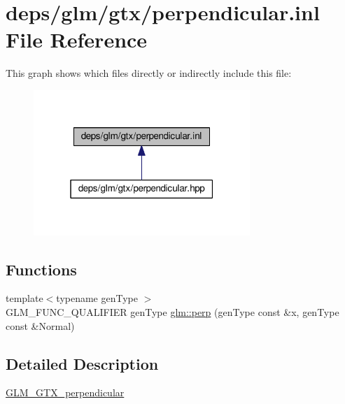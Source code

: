 \hypertarget{perpendicular_8inl}{}\section{deps/glm/gtx/perpendicular.inl File Reference}
\label{perpendicular_8inl}
This graph shows which files directly or indirectly include this file\+:
\nopagebreak
\begin{figure}[H]
\begin{center}
\leavevmode
\includegraphics[width=232pt]{dc/d5a/perpendicular_8inl__dep__incl}
\end{center}
\end{figure}
\subsection*{Functions}
\begin{DoxyCompactItemize}
\item 
{\footnotesize template$<$typename gen\+Type $>$ }\\G\+L\+M\+\_\+\+F\+U\+N\+C\+\_\+\+Q\+U\+A\+L\+I\+F\+I\+ER gen\+Type \hyperlink{group__gtx__perpendicular_ga264cfc4e180cf9b852e943b35089003c}{glm\+::perp} (gen\+Type const \&x, gen\+Type const \&Normal)
\end{DoxyCompactItemize}


\subsection{Detailed Description}
\hyperlink{group__gtx__perpendicular}{G\+L\+M\+\_\+\+G\+T\+X\+\_\+perpendicular} 